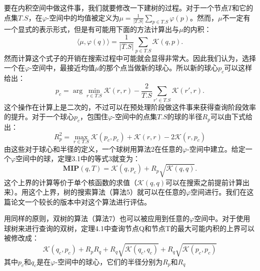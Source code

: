 \documentclass[twocolumn]{article}
\begin{document}
要在内积空间中做这件事，我们就要修改一下建树的过程。对于一个节点$T$和它的点集$T.S$，在$\varphi$-空间中的均值被定义为$\mu=\frac{1}{|T.S|}\sum_{p\in T.S}\varphi(p)$。然而，$\mu$不一定有一个显式的表示形式，但是有可能用下面的方法计算出与$\mu$的内积：
\begin{equation*}
\langle\mu,\varphi(q)\rangle = \frac{1}{|T.S|}\sum_{p \in T.S}\mathcal{K}(q,p).
\end{equation*}
然而计算这个式子的开销在搜索过程中可能就会显得非常大。因此我们认为，选择一个在$\varphi$-空间中，最接近均值$\mu$的那个点当做新的球心。所以新的球心$p_c$可以这样给出：
\begin{equation}
p_c = \arg\min_{r\in T.S}\mathcal{K}(r,r) - \frac{2}{T.S}\sum_{r'\in T.S}\mathcal{K}(r',r).
\end{equation}
这个操作在计算上是二次的，不过可以在预处理阶段做这件事来获得查询阶段效率的提升。对于一个球心$p_c$，包围住$\varphi$-空间中的点集$T.S$的球的半径$R_p$可以由下式给出：
\begin{equation}
R_p^2 = \max_{r\in T.S}\mathcal{K}(p_c,p_c)+\mathcal{K}(r,r) - 2\mathcal{K}(r,p_c)
\end{equation}
由这些对于球心和半径的定义，一个球树用算法2在任意的$\varphi$-空间中建立。给定一个$\varphi$空间中的球，定理3.1中的等式3就变为：
\begin{equation}
\mathbf{MIP}(q,T) = \mathcal{K}(q,p_c) + R_p\sqrt{\mathcal{K}(q,q)}.
\end{equation}
这个上界的计算等价于单个核函数的求值（$\mathcal{K}(q,q)$可以在搜索之前提前计算出来）。用这个上界，树的搜索算法（算法5）就可以在任意的$\varphi$空间进行。我们在这篇论文一个较长的版本中对这个算法进行评估。

用同样的原则，双树的算法（算法7）也可以被应用到任意的$\varphi$空间中。对于使用球树来进行查询的双树，定理4.1中查询节点Q和节点T的最大可能内积的上界可以被修改成：
\begin{equation}
\mathcal{K}(q_c, p_c) + R_p R_q + R_q \sqrt{\mathcal{K}(q_c,q_c)} + R_q \sqrt{\mathcal{K}(p_c, p_c)}
\end{equation}
其中$p_c$和$q_c$是在$\varphi$-空间中的球心，它们的半径分别为$R_p$和$R_q$
\end{document}
